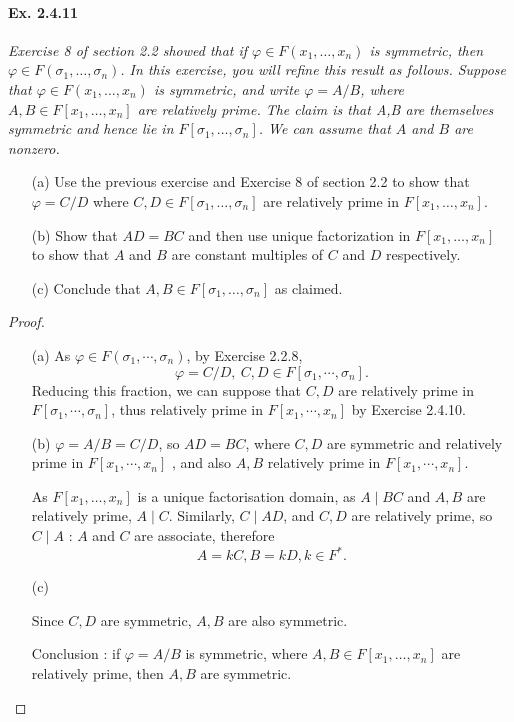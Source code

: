 \documentclass[11pt,a4paper]{article}
\begin{document}
\paragraph{Ex. 2.4.11}

{\it Exercise 8 of section 2.2 showed that if $\varphi \in F(x_1,\ldots,x_n)$ is symmetric, then $\varphi \in F(\sigma_1,\ldots,\sigma_n)$. In this exercise, you will refine this result as follows. Suppose that $\varphi \in F(x_1,\ldots,x_n)$ is symmetric, and write $\varphi = A/B$, where $A,B \in F[x_1,\ldots,x_n]$ are relatively prime. The claim is that A,B are themselves symmetric and hence lie in $F[\sigma_1,\ldots,\sigma_n]$. We can assume that $A$ and $B$ are nonzero.
\begin{enumerate}
\item[(a)] Use the previous exercise and Exercise 8 of section 2.2 to show that $\varphi = C/D$ where $C,D \in F[\sigma_1,\ldots,\sigma_n]$ are relatively prime in $F[x_1,\ldots,x_n]$.
\item[(b)] Show that $AD = BC$ and then use unique factorization in $F[x_1,\ldots,x_n]$ to show that $A$ and $B$ are constant multiples of $C$ and $D$ respectively.
\item[(c)] Conclude that $A,B \in F[\sigma_1,\ldots,\sigma_n]$ as claimed.
\end{enumerate}
}

\begin{proof}
\begin{enumerate}
\item[(a)]
As $\varphi \in F(\sigma_1,\cdots,\sigma_n)$, by Exercise 2.2.8,
$$\varphi = C/D, \ C,D \in F[\sigma_1,\cdots,\sigma_n].$$
Reducing this fraction, we can suppose that $C,D$ are relatively prime in $F[\sigma_1,\cdots,\sigma_n]$, thus relatively prime in  $F[x_1,\cdots, x_n]$ by Exercise 2.4.10.


\item[(b)]
$\varphi = A/B = C/D$, so $AD = BC$, where $C,D$ are symmetric and relatively prime in  $F[x_1,\cdots,x_n]$ , and also $A,B$  relatively prime in  $F[x_1,\cdots,x_n]$.

As $F[x_1,\ldots,x_n]$ is a unique factorisation domain, as $A \mid BC$ and $A,B$ are relatively prime, $A \mid C$. Similarly, $C \mid AD$, and $C,D$ are relatively prime,  so $C \mid A$ : $A$ and $C$ are associate, therefore
$$A = k C, B = k D, k\in F^*.$$


\item[(c)]

Since $C,D$ are symmetric, $A,B$ are also symmetric.

Conclusion : if $\varphi=A/B$ is symmetric, where $A,B \in F[x_1,\ldots,x_n]$ are relatively prime, then $A,B$ are symmetric.
\end{enumerate}
\end{proof}
\end{document}
